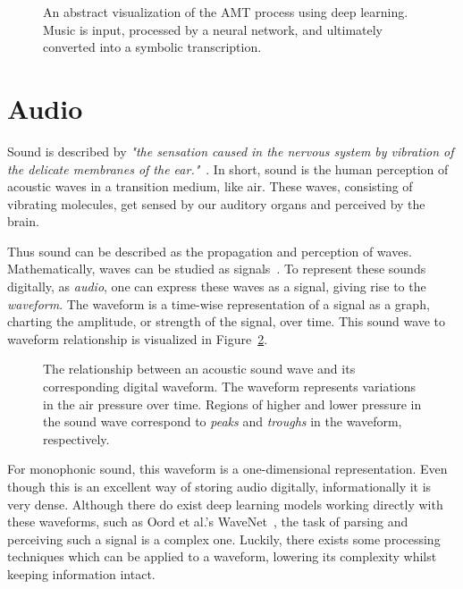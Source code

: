 \begin{figure}[H]
    \centering
    
    \caption{An abstract visualization of the \acrfull{AMT} process using deep learning. Music is input, processed by a neural network, and ultimately converted into a symbolic transcription.}
    \label{AMTFigure}
\end{figure}

\section{Audio}

Sound is described by \textit{"the sensation caused in the nervous system by vibration of the delicate membranes of the ear."}~\cite{1953fundamentals}. In short, sound is the human perception of acoustic waves in a transition medium, like air. These waves, consisting of vibrating molecules, get sensed by our auditory organs and perceived by the brain. 

Thus sound can be described as the propagation and perception of waves. Mathematically, waves can be studied as signals~\cite{8454362}. To represent these sounds digitally, as \textit{audio}, one can express these waves as a signal, giving rise to the \textit{waveform}. The waveform is a time-wise representation of a signal as a graph, charting the amplitude, or strength of the signal, over time. This sound wave to waveform relationship is visualized in Figure~\ref{WaveformFigure}.

\begin{figure}[H]
    \centering
    
    \caption{The relationship between an acoustic sound wave and its corresponding digital waveform. The waveform represents variations in the air pressure over time. Regions of higher and lower pressure in the sound wave correspond to \textit{peaks} and \textit{troughs} in the waveform, respectively.}
    \label{WaveformFigure}
\end{figure}

For monophonic sound, this waveform is a one-dimensional representation. Even though this is an excellent way of storing audio digitally, informationally it is very dense. Although there do exist deep learning models working directly with these waveforms, such as Oord et al.'s WaveNet~\cite{oord2016wavenetgenerativemodelraw}, the task of parsing and perceiving such a signal is a complex one. Luckily, there exists some processing techniques which can be applied to a waveform, lowering its complexity whilst keeping information intact.

